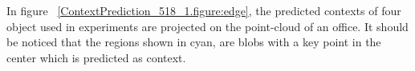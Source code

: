 In figure ~\ref{ContextPrediction_518_1.figure:edge}, the predicted contexts of four object used in experiments 
are projected on the point-cloud of an office. 
It should be noticed that the regions shown in cyan, are blobs with a key point in the center which is predicted as 
context.


% 
% 
% 
% 
% 
% 
% 
% 
